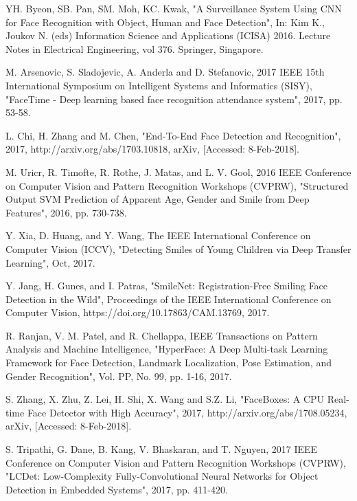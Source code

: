 \documentclass[conference]{IEEEtran}
\begin{document}
\begin{thebibliography}{00}
YH. Byeon, SB. Pan, SM. Moh, KC. Kwak, "A Surveillance System Using CNN for Face Recognition with Object, Human and Face Detection", In: Kim K., Joukov N. (eds) Information Science and Applications (ICISA) 2016. Lecture Notes in Electrical Engineering, vol 376. Springer, Singapore.

M. Arsenovic, S. Sladojevic, A. Anderla and D. Stefanovic, 2017 IEEE 15th International Symposium on Intelligent Systems and Informatics (SISY), "FaceTime - Deep learning based face recognition attendance system", 2017, pp. 53-58.

 L. Chi, H. Zhang and M. Chen, "End-To-End Face Detection and Recognition", 2017, http://arxiv.org/abs/1703.10818, arXiv, [Accessed: 8-Feb-2018].

M. Uricr, R. Timofte, R. Rothe, J. Matas, and L. V. Gool, 2016 IEEE Conference on Computer Vision and Pattern Recognition Workshops (CVPRW), "Structured Output SVM Prediction of Apparent Age, Gender and Smile from Deep Features", 2016, pp. 730-738.

Y. Xia, D. Huang, and Y. Wang, The IEEE International Conference on Computer Vision (ICCV), "Detecting Smiles of Young Children via Deep Transfer Learning", Oct, 2017.

 Y. Jang, H. Gunes, and I. Patras, "SmileNet: Registration-Free Smiling Face Detection in the Wild", Proceedings of the IEEE International Conference on Computer Vision, https://doi.org/10.17863/CAM.13769, 2017.

R. Ranjan, V. M. Patel, and R. Chellappa, IEEE Transactions on Pattern Analysis and Machine Intelligence, "HyperFace: A Deep Multi-task Learning Framework for Face Detection, Landmark Localization, Pose Estimation, and Gender Recognition", Vol. PP, No. 99, pp. 1-16, 2017.


 S. Zhang, X. Zhu, Z. Lei, H. Shi, X. Wang and S.Z. Li, "FaceBoxes: {A} {CPU} Real-time Face Detector with High Accuracy", 2017, http://arxiv.org/abs/1708.05234, arXiv, [Accessed: 8-Feb-2018].

S. Tripathi, G. Dane, B. Kang, V. Bhaskaran, and T. Nguyen, 2017 IEEE Conference on Computer Vision and Pattern Recognition Workshops (CVPRW), "LCDet: Low-Complexity Fully-Convolutional Neural Networks for Object Detection in Embedded Systems", 2017, pp. 411-420.


\end{thebibliography}
\end{document}
